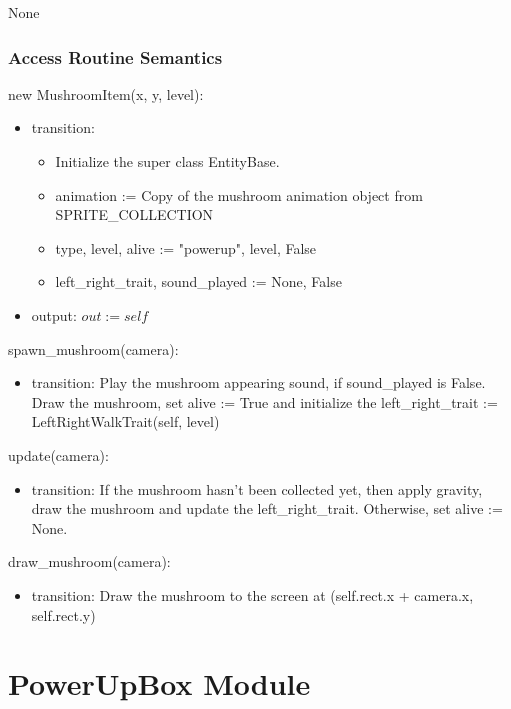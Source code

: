 \documentclass[12pt]{article}
\begin{document}
None

\subsubsection* {Access Routine Semantics}

new MushroomItem(x, y, level):
\begin{itemize}
    \item transition: 
    \begin{itemize}[]
        \item Initialize the super class EntityBase.
        \item animation := Copy of the mushroom animation object from SPRITE\_COLLECTION
        \item type, level, alive := "powerup", level, False
        \item left\_right\_trait, sound\_played := None, False
    \end{itemize}
    \item output: $out := self$
\end{itemize}

\noindent spawn\_mushroom(camera):
\begin{itemize}
    \item transition: Play the mushroom appearing sound, if sound\_played is False. Draw the mushroom, set alive := True and initialize the left\_right\_trait := LeftRightWalkTrait(self, level)
\end{itemize}

\noindent update(camera):
\begin{itemize}
    \item transition: If the mushroom hasn't been collected yet, then apply gravity, draw the mushroom and update the left\_right\_trait. Otherwise, set alive := None.
\end{itemize}

\noindent draw\_mushroom(camera):
\begin{itemize}
    \item transition: Draw the mushroom to the screen at (self.rect.x + camera.x, self.rect.y)
\end{itemize}

\newpage

\section*{PowerUpBox Module}
\end{document}
